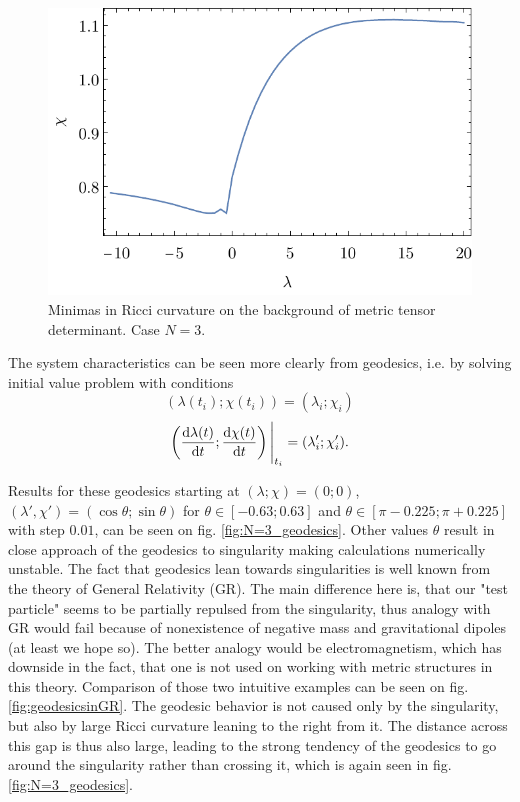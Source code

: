 \begin{figure}[H]
    \centering
    \includegraphics{../img/N=3_RicMinimas.pdf}
    \caption{Minimas in Ricci curvature on the background of metric tensor determinant. Case $N=3$.}
    \label{fig:N=3_RicMinimas}    
\end{figure}

The system characteristics can be seen more clearly from geodesics, i.e. by solving initial value problem with conditions
$$(\lambda(t_i);\chi(t_i))=(\lambda_i;\chi_i)$$
$$\left(\frac{\mathrm{d} \lambda(t)}{\mathrm{d} t};\frac{\mathrm{d} \chi(t)}{\mathrm{d} t}\right)\Bigg|_{t_i}=(\lambda'_i;\chi'_i).$$

Results for these geodesics starting at $(\lambda;\chi)=(0;0)$, $(\lambda',\chi')=(\cos\theta;\sin\theta)$ for $\theta\in [-0.63;0.63]$ and $\theta\in [\pi-0.225;\pi+0.225]$ with step $0.01$, can be seen on fig. \ref{fig:N=3_geodesics}. Other values $\theta$ result in close approach of the geodesics to singularity making calculations numerically unstable. The fact that geodesics lean towards singularities is well known from the theory of General Relativity (GR). The main difference here is, that our "test particle" seems to be partially repulsed from the singularity, thus analogy with GR would fail because of nonexistence of negative mass and gravitational dipoles (at least we hope so). The better analogy would be electromagnetism, which has downside in the fact, that one is not used on working with metric structures in this theory. Comparison of those two intuitive examples can be seen on fig. \ref{fig:geodesicsinGR}. The geodesic behavior is not caused only by the singularity, but also by large Ricci curvature leaning to the right from it. The distance across this gap is thus also large, leading to the strong tendency of the geodesics to go around the singularity rather than crossing it, which is again seen in fig. \ref{fig:N=3_geodesics}.


